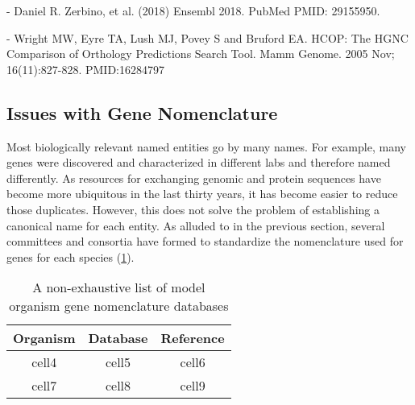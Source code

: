 - Daniel R. Zerbino, et al. (2018) Ensembl 2018. PubMed PMID: 29155950.

- Wright MW, Eyre TA, Lush MJ, Povey S and Bruford EA. HCOP: The HGNC Comparison of Orthology Predictions Search Tool. Mamm Genome. 2005 Nov; 16(11):827-828. PMID:16284797

\subsection{Issues with Gene Nomenclature}

Most biologically relevant named entities go by many names. For example, many genes were discovered and characterized in different labs and therefore named differently. As resources for exchanging genomic and protein sequences have become more ubiquitous in the last thirty years, it has become easier to reduce those duplicates. However, this does not solve the problem of establishing a canonical name for each entity. As alluded to in the previous section, several committees and consortia have formed to standardize the nomenclature used for genes for each species (\ref{table:gene_nomenclature_databases}).

\begin{table}
\centering
\begin{tabular}{ c c c }
  Organism & Database & Reference \\
	\hline
 cell4 & cell5 & cell6 \\
 cell7 & cell8 & cell9
\end{tabular}
\caption{A non-exhaustive list of model organism gene nomenclature databases}
\label{table:gene_nomenclature_databases}
\end{table}
